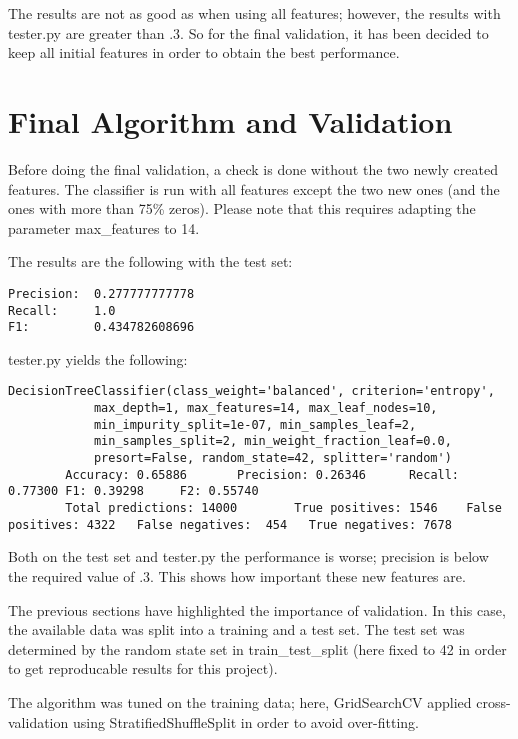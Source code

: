 \documentclass[11pt]{article} %
\begin{document}
The results are not as good as when using all features; however, the results with tester.py are greater than .3. So for the final validation, it has been decided to keep all initial features in order to obtain the best performance.


\section{Final Algorithm and Validation}

Before doing the final validation, a check is done without the two newly created features. The classifier is run with all features except the two new ones (and the ones with more than 75\% zeros). Please note that this requires adapting the parameter {\selectfont max\_features} to 14.\medskip

The results are the following with the test set:
\begin{verbatim}
Precision:  0.277777777778
Recall:     1.0
F1:         0.434782608696
\end{verbatim}
tester.py yields the following:
{\tiny
\begin{verbatim}
DecisionTreeClassifier(class_weight='balanced', criterion='entropy',
            max_depth=1, max_features=14, max_leaf_nodes=10,
            min_impurity_split=1e-07, min_samples_leaf=2,
            min_samples_split=2, min_weight_fraction_leaf=0.0,
            presort=False, random_state=42, splitter='random')
        Accuracy: 0.65886       Precision: 0.26346      Recall: 0.77300 F1: 0.39298     F2: 0.55740
        Total predictions: 14000        True positives: 1546    False positives: 4322   False negatives:  454   True negatives: 7678
\end{verbatim}
}
Both on the test set and tester.py the performance is worse; precision is below the required value of .3. This shows how important these new features are.\medskip

The previous sections have highlighted the importance of validation. In this case, the available data was split into a training and a test set. The test set was determined by the random state set in {\selectfont train\_test\_split} (here fixed to 42 in order to get reproducable results for this project). \medskip

The algorithm was tuned on the training data; here, {\selectfont GridSearchCV} applied cross-validation using {\selectfont StratifiedShuffleSplit} in order to avoid over-fitting. \medskip
\end{document}
